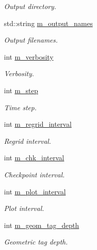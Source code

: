 \begin{DoxyCompactItemize}
\begin{DoxyCompactList}\small\item\em Output directory. \end{DoxyCompactList}\item 
std\+::string \hyperlink{classplasma__engine_a8af0830c8c4262753dad80b8879d3f3d}{m\+\_\+output\+\_\+names}
\begin{DoxyCompactList}\small\item\em Output filenames. \end{DoxyCompactList}\item 
int \hyperlink{classplasma__engine_a763a8e4ae0a147f53b9a42e975ad57bc}{m\+\_\+verbosity}
\begin{DoxyCompactList}\small\item\em Verbosity. \end{DoxyCompactList}\item 
int \hyperlink{classplasma__engine_a3aa7457ef6831689de8a12559195c8c7}{m\+\_\+step}
\begin{DoxyCompactList}\small\item\em Time step. \end{DoxyCompactList}\item 
int \hyperlink{classplasma__engine_a7b2c464f655a22bd9968255e3161fb33}{m\+\_\+regrid\+\_\+interval}
\begin{DoxyCompactList}\small\item\em Regrid interval. \end{DoxyCompactList}\item 
int \hyperlink{classplasma__engine_aeb4e9f7e160f2b7cbd62571e4fbd4573}{m\+\_\+chk\+\_\+interval}
\begin{DoxyCompactList}\small\item\em Checkpoint interval. \end{DoxyCompactList}\item 
int \hyperlink{classplasma__engine_ad61988b7cf22b7589b95afdbbf17fd38}{m\+\_\+plot\+\_\+interval}
\begin{DoxyCompactList}\small\item\em Plot interval. \end{DoxyCompactList}\item 
int \hyperlink{classplasma__engine_af4cedda8e4d0f803d4816476c3be422c}{m\+\_\+geom\+\_\+tag\+\_\+depth}
\begin{DoxyCompactList}\small\item\em Geometric tag depth. \end{DoxyCompactList}\item 

\end{DoxyCompactItemize}
